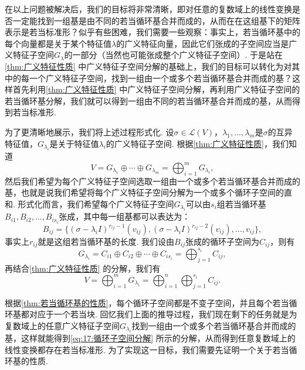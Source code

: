 在以上问题被解决后，我们的目标将非常清晰，即对任意的复数域上的线性变换是否一定能找到一组基是由不同的若当循环基合并而成的，从而在在这组基下的矩阵表示是若当标准形？似乎有些困难，我们需要一些观察：事实上，若当循环基中的每个向量都是关于某个特征值$\lambda$的广义特征向量，因此它们张成的子空间应当是广义特征子空间$G_\lambda$的一部分（当然也可能张成整个广义特征子空间）. 于是站在\autoref{thm:广义特征性质} 中广义特征子空间分解的基础上，我们的目标可以转化为对其中的每一个广义特征子空间，找到一组由一个或多个若当循环基合并而成的基？这样首先利用\autoref{thm:广义特征性质} 中广义特征子空间分解，再利用广义特征子空间的若当循环基分解，我们就可以得到一组由不同的若当循环基合并而成的基，从而得到若当标准形.

为了更清晰地展示，我们将上述过程形式化. 设$\sigma\in\mathcal{L}(V)$，$\lambda_1,\ldots,\lambda_m$是$\sigma$的互异特征值，$G_{\lambda_i}$是关于特征值$\lambda_i$的广义特征子空间. 根据\autoref{thm:广义特征性质}，我们知道
\[V=G_{\lambda_1}\oplus\cdots\oplus G_{\lambda_m}=\bigoplus_{i=1}^m G_{\lambda_i},\]
然后我们希望为每个广义特征子空间选取一组由一个或多个若当循环基合并而成的基，也就是说我们希望将每个广义特征子空间分解为一个或多个循环子空间的直和. 形式化而言，我们希望每个广义特征子空间$G_{\lambda_i}$可以由$s_i$组若当循环基$B_{i1},B_{i2},\ldots,B_{is_i}$张成，其中每一组基都可以表达为：
\[B_{ij}=\{(\sigma-\lambda_iI)^{r_{ij}-1}(v_{ij}),(\sigma-\lambda_iI)^{r_{ij}-2}(v_{ij}),\ldots,v_{ij}\},\]
事实上$r_{ij}$就是这组若当循环基的长度. 我们设由$B_{ij}$张成的循环子空间为$C_{ij}$，则有
\[G_{\lambda_i}=C_{i1}\oplus C_{i2}\oplus\cdots\oplus C_{is_i}=\bigoplus_{j=1}^{s_i} C_{ij},\]
再结合\autoref{thm:广义特征性质} 的分解，我们有
\begin{equation} \label{eq:17:循环子空间分解}
    V=\bigoplus_{i=1}^m G_{\lambda_i}=\bigoplus_{i=1}^n\bigoplus_{j=1}^{s_i} C_{ij}.
\end{equation}

根据\autoref{thm:若当循环基的性质}，每个循环子空间都是不变子空间，并且每个若当循环基都对应于一个若当块. 回忆我们上面的推导过程，我们现在剩下的任务就是为复数域上的任意广义特征子空间$G_{\lambda_i}$找到一组由一个或多个若当循环基合并而成的基，这样就能得到\autoref{eq:17:循环子空间分解} 所示的分解，从而得到任意复数域上的线性变换都存在若当标准形. 为了实现这一目标，我们需要先证明一个关于若当循环基的性质.

